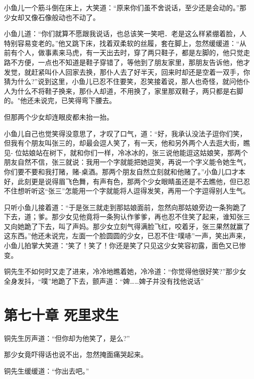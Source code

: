 \documentclass[12pt,oneside]{book}
\begin{document}
小鱼儿一个筋斗倒在床上，大笑道：``原来你们虽不舍说话，至少还是会动的。''那少女却又像石像般动也不动了。

小鱼儿道：``你们就算不愿跟我说话，也总该笑一笑吧．老是这么样紧绷着脸，人特别容易变老的。''他又跳下床，找着双柔软的丝履，套在脚上，忽然缓缓道：``从前有个人，做事素来马虎，有一天出去时，穿了两只鞋子，都是左脚的，他只觉走路不方便，一点也不知道是鞋子穿错了，等他到了朋友家里，那朋友告诉他，他才发觉，就赶紧叫仆人回家去换，那仆人去了好半天，回来时却还是空着一双手，你猜为什么?''说到这里，小鱼儿已忍不住要笑，忍笑接着说，那人也奇怪，就问他仆人为什么不将鞋子换来，那仆人却道，不用换了，家里那双鞋子，两只都是右脚的。"他还未说完，已笑得弯下腰去。

但那两个少女却连眼皮都未抬一抬。

小鱼儿自己也觉笑得没意思了，才叹了口气，道：``好，我承认没法子逗你们笑，但我有个朋友叫张三的，却最会逗人笑了，有一天，他和另外两个人去逛大街，瞧见-
位姑娘站在树下，就和你们一样，冷冰冰的，张三说他能逗这姑娘笑，那两个朋友自然不信，张三就说：我用一个字就能把她逗笑，再说一个字义能令她生气，你们要不要和我打赌，赌-桌酒。那两个朋友自然立刻就和他赌了。''小鱼儿口才本好，此刻更是说得眉飞色舞，有声有色，那两个少女眼睛虽还是不去瞧他，但已忍不住想听听这``张三''怎能用一个字就能将人逗得发笑，再用一个字逗得别人生气。

只听小鱼儿接着道：``于是张三就走到那姑娘面前，忽然向那姑娘旁边一条狗跪了下去，道；爹。那少女见他竟将一条狗认作爹爹，再也忍不住笑了起来，谁知张三又向她跪了下去，叫了声妈。那少女立刻气得满脸飞红，咬着牙，张三果然就赢了这东西。''他还未说完，左面一个脸圆圆的少女，已忍不住``噗哧''一声，笑出声来，小鱼儿拍掌大笑道："笑了！笑了！你还是笑了只见这少女笑容初露，面色又已惨变。

铜先生不如何时又走了进来，冷冷地瞧着她，冷冷道：``你觉得他很好笑?''那少女全身发抖，``噗''地跪了下去，颤声道：``婢\ldots\ldots 婢子并没有找他说话''

\hypertarget{ux7b2cux4e03ux5341ux7ae0-ux6b7bux91ccux6c42ux751f}{%
\chapter{第七十章
死里求生}\label{ux7b2cux4e03ux5341ux7ae0-ux6b7bux91ccux6c42ux751f}}

铜先生厉声道：``但你却为他笑了，是么?''

那少女竟吓得话也说不出，忽然掩面痛哭起来。

铜先生缓缓道：``你出去吧。''
\end{document}
